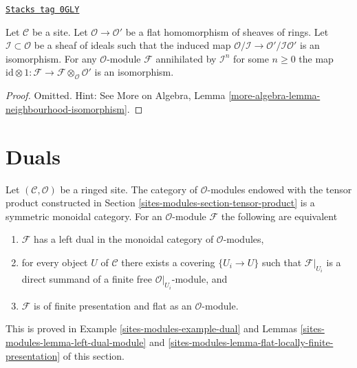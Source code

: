 \begin{lemma}
\label{sites-modules-lemma-neighbourhood-isomorphism}
\href{https://stacks.math.columbia.edu/tag/0GLY}{\texttt{Stacks tag 0GLY}}

Let $\mathcal{C}$ be a site. Let $\mathcal{O} \to \mathcal{O}'$
be a flat homomorphism of sheaves of rings. Let
$\mathcal{I} \subset \mathcal{O}$
be a sheaf of ideals such that the induced map
$\mathcal{O}/\mathcal{I} \to \mathcal{O}'/\mathcal{I}\mathcal{O}'$
is an isomorphism. For any $\mathcal{O}$-module $\mathcal{F}$
annihilated by $\mathcal{I}^n$ for some $n \geq 0$ the map
$\text{id} \otimes 1 :
\mathcal{F} \to \mathcal{F} \otimes_\mathcal{O} \mathcal{O}'$
is an isomorphism.
\end{lemma}

\begin{proof}
Omitted. Hint: See More on Algebra, Lemma
\ref{more-algebra-lemma-neighbourhood-isomorphism}.
\end{proof}

\section{Duals}
\label{sites-modules-section-duals}
Let $(\mathcal{C}, \mathcal{O})$ be a ringed site. The category of
$\mathcal{O}$-modules endowed with the tensor product
constructed in Section \ref{sites-modules-section-tensor-product}
is a symmetric monoidal category. For an $\mathcal{O}$-module
$\mathcal{F}$ the following are equivalent
\begin{enumerate}
\item $\mathcal{F}$ has a left dual in the monoidal category
of $\mathcal{O}$-modules,
\item for every object $U$ of $\mathcal{C}$ there exists a covering
$\{U_i \to U\}$ such that $\mathcal{F}|_{U_i}$ is a direct summand
of a finite free $\mathcal{O}|_{U_i}$-module, and
\item $\mathcal{F}$ is of finite presentation and flat as an
$\mathcal{O}$-module.
\end{enumerate}
This is proved in Example \ref{sites-modules-example-dual} and
Lemmas \ref{sites-modules-lemma-left-dual-module} and
\ref{sites-modules-lemma-flat-locally-finite-presentation} of this section.

